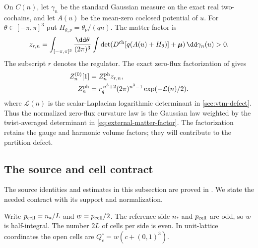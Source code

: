 On $C(n)$, let $\gamma_n$ be the standard Gaussian measure
on the exact real two-cochains, and let $A(u)$ be the
mean-zero coclosed potential of $u$.
For $\theta\in[-\pi,\pi]^3$ put
$H_{\theta,\nu}=\theta_\nu/(qn)$. The matter factor is
\begin{equation}\label{eq:external-matter-factor}
 z_{r,n}=\int_{[-\pi,\pi]^3}\frac{\dd\theta}{(2\pi)^3}
     \int\det(D^{\rm ch}[q(A(u)+H_\theta)]
                     +\boldsymbol\mu)\,\dd\gamma_n(u)>0.
\end{equation}
The subscript $r$ denotes the regulator. The exact zero-flux
factorization of \cite[\S3.4]{ReferenceResponse} gives
\begin{align}
 Z_n^{(0)}[1]&=Z_n^{\rm ph}z_{r,n},
                     \label{eq:external-zero-factorization}\\
 Z_n^{\rm ph}&=r_q^{\,n^3+2}(2\pi)^{n^3-1}
                         \exp(-\mathcal L(n)/2).
                     \label{eq:external-photon-factor}
\end{align}
where $\mathcal L(n)$ is the scalar-Laplacian logarithmic
determinant in \cref{sec:vtm-defect}.
Thus the normalized zero-flux curvature law is the Gaussian
law weighted by the twist-averaged determinant in
\eqref{eq:external-matter-factor}. The factorization retains
the gauge and harmonic volume factors; they will contribute
to the partition defect.

\subsection{The source and cell contract}\label{sec:reference-cells}

The source identities and estimates in this subsection are
proved in \cite[\S2]{ReferenceResponse}. We state the needed
contract with its support and normalization.

Write $p_{\rm cell}=n_*/L$ and $w=p_{\rm cell}/2$.
The reference side $n_*$ and $p_{\rm cell}$ are odd,
so $w$ is half-integral. The number $2L$ of cells per
side is even. In unit-lattice coordinates the open cells
are $Q_c^\circ=w(c+(0,1)^3)$.

